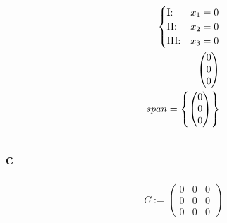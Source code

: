 \begin{align*}
    \begin{cases}
        \text{I:\@}   & x_1 = 0 \\
        \text{II:\@}  & x_2 = 0 \\
        \text{III:\@} & x_3 = 0
    \end{cases} \\
    \begin{pmatrix}
        0 \\ 0 \\ 0
    \end{pmatrix}          \\
    span = \left\{\begin{pmatrix}
                      0 \\ 0 \\ 0
                  \end{pmatrix}\right\}
\end{align*}

\subsection{c}

\begin{align*}
    C := \begin{pmatrix}
             0 & 0 & 0 \\
             0 & 0 & 0 \\
             0 & 0 & 0
         \end{pmatrix}
\end{align*}

